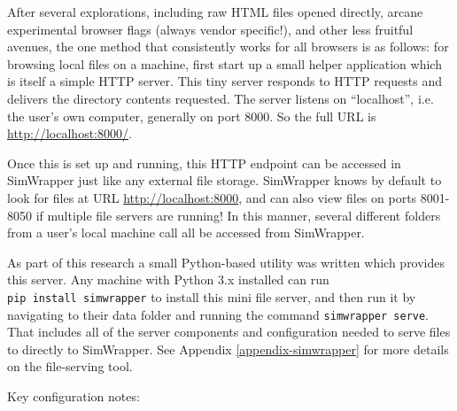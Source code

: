 After several explorations, including raw HTML files opened directly, arcane experimental browser flags (always vendor specific!), and other less fruitful avenues, the one method that consistently works for all browsers is as follows: for browsing local files on a machine, first start up a small helper application which is itself a simple HTTP server. This tiny server responds to HTTP requests and delivers the directory contents requested. The server listens on ``localhost'', i.e. the user's own computer, generally on port 8000. So the full URL is \url{http://localhost:8000/}.

Once this is set up and running, this HTTP endpoint can be accessed in SimWrapper just like any external file storage. SimWrapper knows by default to look for files at URL \url{http://localhost:8000}, and can also view files on ports 8001-8050 if multiple file servers are running! In this manner, several different folders from a user's local machine call all be accessed from SimWrapper.

As part of this research a small Python-based utility was written which provides this server. Any machine with Python 3.x installed can run \texttt{pip\ install\ simwrapper} to install this mini file server, and then run it by navigating to their data folder and running the command \texttt{simwrapper\ serve}. That includes all of the server components and configuration needed to serve files to directly to SimWrapper. See Appendix \ref{appendix-simwrapper} for more details on the file-serving tool.

Key configuration notes:

